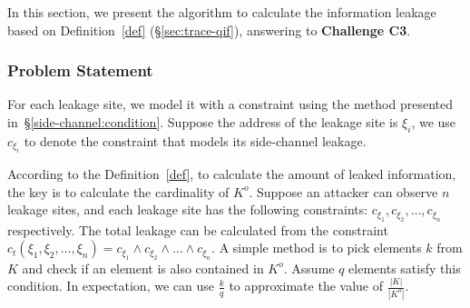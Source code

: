 

\newcommand{\addr}[1]{{l}_{#1}}
\renewcommand{\addr}[1]{{\gamma}_{#1}}
\renewcommand{\addr}[1]{{\zeta}_{#1}}
\renewcommand{\addr}[1]{{\xi}_{#1}}

In this section, we present the algorithm to calculate the information leakage
based on Definition~\ref{def} (\S\ref{sec:trace-qif}), answering to
\textbf{Challenge C3}.

\subsubsection{Problem Statement}
For each leakage site, we model it with a constraint using the
method presented in~\S\ref{side-channel:condition}. Suppose the address of the
leakage site is $\addr{i}$, we use $c_{\addr{i}}$ to denote the constraint
that models its side-channel leakage. 

According to the Definition~\ref{def}, to calculate the amount of leaked
information, the key is to calculate the cardinality
of $K^o$. Suppose an attacker can observe $n$ leakage sites, and each leakage
site has the following constraints: $c_{\addr{1}}, c_{\addr{2}}, \ldots,
c_{\addr{n}}$ respectively. The total leakage can be calculated from the constraint
$c_t({\addr{1}},{\addr{2}},\ldots,{\addr{n}}) = c_{\addr{1}} \land c_{\addr{2}}
\land \ldots \land c_{\addr{n}}$. 
A simple method is to pick elements $k$ from $K$ and check if an
element is also contained in $K^o$. Assume $q$ elements satisfy this condition. In
expectation, we can use $\frac{k}{q}$ to approximate the value of
$\frac{|K|}{|K^o|}$.

